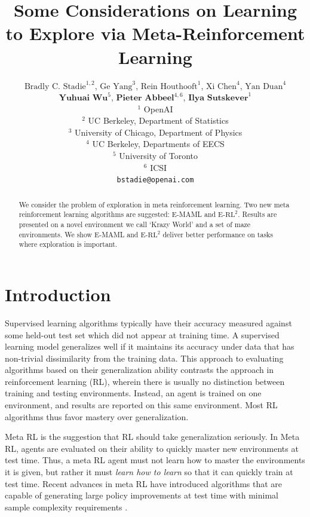 \documentclass{article} %
\title{Some Considerations on Learning to Explore via Meta-Reinforcement Learning}
\author{$\text{Bradly C. Stadie}^{1, 2}$, $\text{Ge Yang}^{3}$, $\text{Rein Houthooft}^{1}$, $\text{Xi Chen}^{4}$, $\text{Yan Duan}^{4}$ \\$\textbf{Yuhuai Wu}^{5}$, $\textbf{Pieter Abbeel}^{4, 6}$, $\textbf{Ilya Sutskever}^{1}$  \\ 
$^1$ OpenAI\\
$^2$ UC Berkeley, Department of Statistics\\
$^3$ University of Chicago, Department of Physics \\
$^4$ UC Berkeley, Departments of EECS\\
$^5$ University of Toronto \\
$^6$ ICSI \\
\texttt{bstadie@openai.com} \\
}
\begin{document}
\maketitle

\begin{abstract}
We consider the problem of exploration in meta reinforcement learning. Two new meta reinforcement learning algorithms are suggested: E-MAML and E-$\text{RL}^2$. Results are presented on a novel environment we call `Krazy World'  and a set of maze environments. We show E-MAML and E-$\text{RL}^2$ deliver better performance on tasks where exploration is important.
\end{abstract}

\section{Introduction}
Supervised learning algorithms typically have their accuracy measured against some held-out test set which did not appear at training time. A supervised learning model generalizes well if it maintains its accuracy under data that has non-trivial dissimilarity from the training data. This approach to evaluating algorithms based on their generalization ability contrasts the approach in reinforcement learning (RL), wherein there is usually no distinction between training and testing environments. Instead, an agent is trained on one environment, and results are reported on this same environment. Most RL algorithms thus favor mastery over generalization. 

Meta RL is the suggestion that RL should take generalization seriously. In Meta RL, agents are evaluated on their ability to quickly master new environments at test time. Thus, a meta RL agent must not learn how to master the environments it is given, but rather it must \textit{learn how to learn} so that it can quickly train at test time. Recent advances in meta RL have introduced algorithms that are capable of generating large policy improvements at test time with minimal sample complexity requirements \cite{maml, rl2, learntorl}.   
\end{document}
